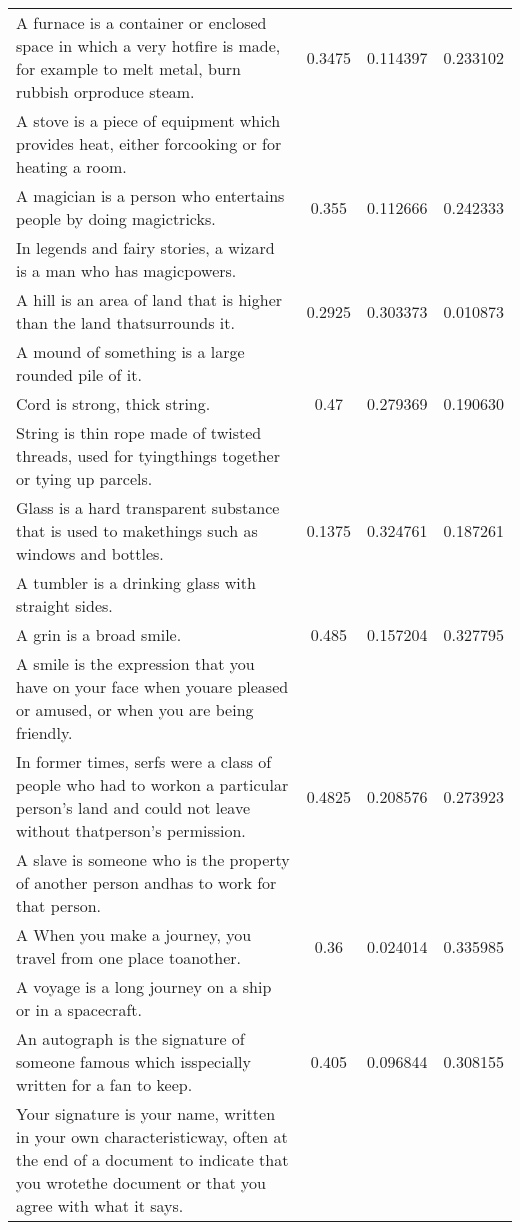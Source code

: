 \begin{table}[p]
\begin{center}
{\begin{tabular}{|p{9cm}|c|c|c|}
A furnace is a container or enclosed space in which a very hotfire is made, for example to melt metal, burn rubbish orproduce steam. & 0.3475 & 0.114397 & 0.233102 \\
A stove is a piece of equipment which provides heat, either forcooking or for heating a room. & & & \\
\hline
A magician is a person who entertains people by doing magictricks. & 0.355 & 0.112666 & 0.242333 \\
In legends and fairy stories, a wizard is a man who has magicpowers. & & & \\
\hline
A hill is an area of land that is higher than the land thatsurrounds it. & 0.2925 & 0.303373 & 0.010873 \\
A mound of something is a large rounded pile of it. & & & \\
\hline
Cord is strong, thick string. & 0.47 & 0.279369 & 0.190630 \\
String is thin rope made of twisted threads, used for tyingthings together or tying up parcels. & & & \\
\hline
Glass is a hard transparent substance that is used to makethings such as windows and bottles. & 0.1375 & 0.324761 & 0.187261 \\
A tumbler is a drinking glass with straight sides. & & & \\
\hline
A grin is a broad smile. & 0.485 & 0.157204 & 0.327795 \\
A smile is the expression that you have on your face when youare pleased or amused, or when you are being friendly. & & & \\
\hline
In former times, serfs were a class of people who had to workon a particular person's land and could not leave without thatperson's permission. & 0.4825 & 0.208576 & 0.273923 \\
A slave is someone who is the property of another person andhas to work for that person. & & & \\
\hline
A When you make a journey, you travel from one place toanother. & 0.36 & 0.024014 & 0.335985 \\
A voyage is a long journey on a ship or in a spacecraft. & & & \\
\hline
An autograph is the signature of someone famous which isspecially written for a fan to keep. & 0.405 & 0.096844 & 0.308155 \\
Your signature is your name, written in your own characteristicway, often at the end of a document to indicate that you wrotethe document or that you agree with what it says. & & & \\

\end{tabular}}
\end{center}
\end{table}
